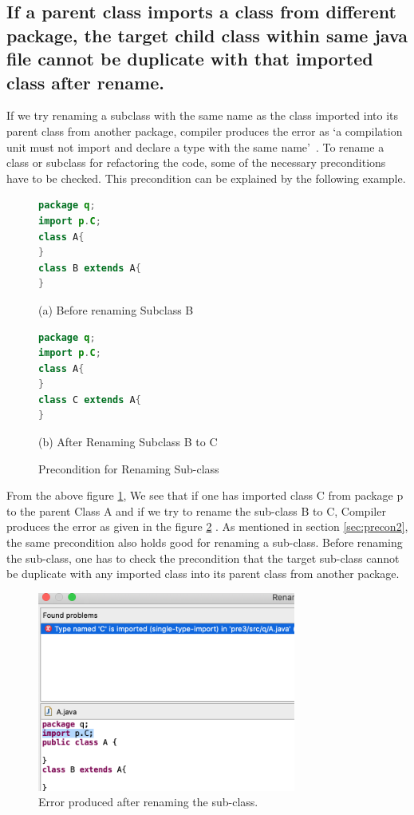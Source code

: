 \subsection{If a parent class imports a class from different package, the target child class within same java file cannot be duplicate with that imported class after rename.}

If we try renaming a subclass with the same name as the class imported into its parent class from another package, compiler produces the error as `a compilation unit must not import and declare a type with the same name'~\cite{EclipseWebPage}. 
To rename a class or subclass for refactoring the code, some of the necessary preconditions have to be checked. This precondition can be explained by the following example.

\begin{figure}[th]
\centering
\begin{minipage}[t]{0.45\linewidth}
\begin{lstlisting}[language=java, basicstyle=\scriptsize\ttfamily,frame=single]	
package q;
import p.C;
class A{	
}
class B extends A{	
}	
\end{lstlisting}
\tiny{(a) Before renaming Subclass B}
\end{minipage}
\hfill
\begin{minipage}[t]{0.45\linewidth}
\begin{lstlisting}[language=java, basicstyle=\scriptsize\ttfamily,frame=single]
package q;
import p.C;
class A{	
}
class C extends A{	
}	
\end{lstlisting}
\tiny{(b) After Renaming Subclass B to C}
\end{minipage}
\caption{Precondition for Renaming Sub-class}
\label{figure:fig7}
\end{figure}

From the above figure \ref{figure:fig7}, We see that if one has imported class C from  package  p to the parent Class A and if we try to rename the sub-class B to C, Compiler produces  the error as given in the figure \ref{figure:fig8} . As mentioned in  section \ref{sec:precon2}, the same precondition also holds good for renaming a sub-class. Before renaming the sub-class, one has to check the precondition that the  target sub-class cannot be duplicate with any imported class into its parent class from another package.

\begin{figure}[htbp]
\centerline{\includegraphics[width=85mm,scale=0.5]{precond3.png}}
\caption{Error produced after renaming the sub-class.}
\label{figure:fig8}
\end{figure}
